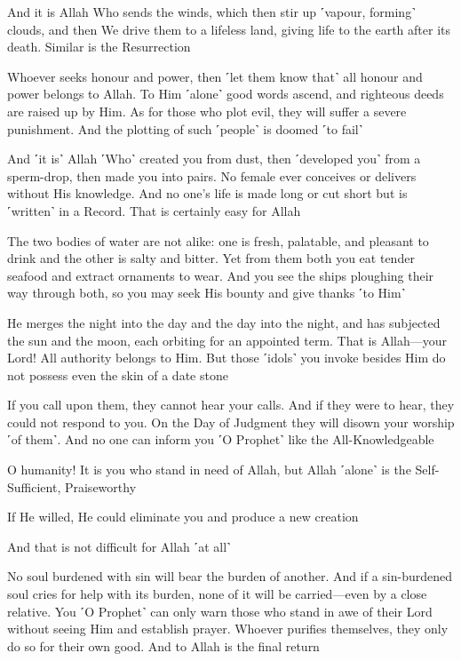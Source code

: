 And it is Allah Who sends the winds, which then stir up ˹vapour, forming˺ clouds, and then We drive them to a lifeless land, giving life to the earth after its death. Similar is the Resurrection

Whoever seeks honour and power, then ˹let them know that˺ all honour and power belongs to Allah. To Him ˹alone˺ good words ascend, and righteous deeds are raised up by Him. As for those who plot evil, they will suffer a severe punishment. And the plotting of such ˹people˺ is doomed ˹to fail˺

And ˹it is˺ Allah ˹Who˺ created you from dust, then ˹developed you˺ from a sperm-drop, then made you into pairs. No female ever conceives or delivers without His knowledge. And no one’s life is made long or cut short but is ˹written˺ in a Record. That is certainly easy for Allah

The two bodies of water are not alike: one is fresh, palatable, and pleasant to drink and the other is salty and bitter. Yet from them both you eat tender seafood and extract ornaments to wear. And you see the ships ploughing their way through both, so you may seek His bounty and give thanks ˹to Him˺

He merges the night into the day and the day into the night, and has subjected the sun and the moon, each orbiting for an appointed term. That is Allah—your Lord! All authority belongs to Him. But those ˹idols˺ you invoke besides Him do not possess even the skin of a date stone

If you call upon them, they cannot hear your calls. And if they were to hear, they could not respond to you. On the Day of Judgment they will disown your worship ˹of them˺. And no one can inform you ˹O Prophet˺ like the All-Knowledgeable

O humanity! It is you who stand in need of Allah, but Allah ˹alone˺ is the Self-Sufficient, Praiseworthy

If He willed, He could eliminate you and produce a new creation

And that is not difficult for Allah ˹at all˺

No soul burdened with sin will bear the burden of another. And if a sin-burdened soul cries for help with its burden, none of it will be carried—even by a close relative. You ˹O Prophet˺ can only warn those who stand in awe of their Lord without seeing Him and establish prayer. Whoever purifies themselves, they only do so for their own good. And to Allah is the final return

